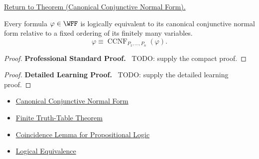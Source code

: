\newpage
{}
\label{prf:canonical-conjunctive-normal-form-propositional-logic}

\begin{remark*}[Return]
\hyperref[thm:canonical-conjunctive-normal-form-propositional-logic]{Return to Theorem (Canonical Conjunctive Normal Form).}
\end{remark*}

\begin{theorem*}
Every formula \(\varphi\in\WFF\) is logically equivalent to its canonical
conjunctive normal form relative to a fixed ordering of its finitely many
variables.
\[
\varphi\equiv \operatorname{CCNF}_{P_1,\ldots,P_n}(\varphi).
\]
\end{theorem*}

\begin{proof}
\textbf{Professional Standard Proof.}~
TODO: supply the compact proof.
\end{proof}

\begin{proof}
\textbf{Detailed Learning Proof.}~
TODO: supply the detailed learning proof.
\end{proof}

\begin{remark*}
\end{remark*}

\begin{dependencies}
\begin{itemize}
  \item \hyperref[def:canonical-conjunctive-normal-form-propositional-logic]{Canonical Conjunctive Normal Form}
  \item \hyperref[thm:finite-truth-table-propositional-logic]{Finite Truth-Table Theorem}
  \item \hyperref[lem:coincidence-lemma-propositional-logic]{Coincidence Lemma for Propositional Logic}
  \item \hyperref[def:logical-equivalence-propositional-logic]{Logical Equivalence}
\end{itemize}
\end{dependencies}

\clearpage
